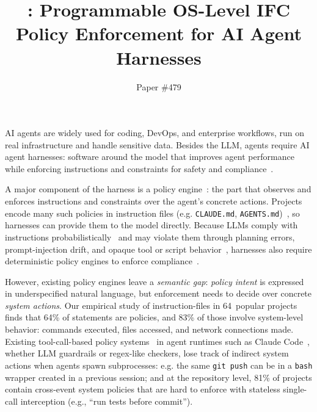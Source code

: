 \documentclass[sigplan,10pt]{acmart}
\title[\sys{}]{\sys{}: Programmable OS-Level IFC Policy Enforcement for AI Agent Harnesses}
\author{Paper \#479}
\affiliation{%
  \institution{Anonymous Submission}
  \city{}
  \country{}}
\begin{document}
\maketitle

AI agents are widely used for coding,
DevOps, and enterprise workflows\cite{yang2024sweagent,wang2025openhands,
debenedetti2024agentdojo,zhan2024injecagent,agentsight},
run on real infrastructure and handle sensitive data.
Besides the LLM,
agents require AI agent harnesses:
software around
the model that improves agent
performance while enforcing instructions
and constraints for safety and
compliance~\cite{fowler-harness}.

A major component of the harness is a policy engine~\cite{langchain-harness}: the
part that observes and enforces
instructions and constraints over
the agent's concrete
actions. Projects encode
many such
policies in instruction files
(e.g. \texttt{CLAUDE.md},
\texttt{AGENTS.md})~\cite{chatlatanagulchai2025manifests,
chatlatanagulchai2025agentreadmes,santos2025claudeconfig,
lulla2026agentsmd}, so
harnesses can provide them
to the model directly.
Because LLMs comply with
instructions
probabilistically~\cite{liu2024lost,jiang2024followbench,qi2025agentif}
and may violate them through planning errors,
prompt-injection drift,
and opaque tool or script
behavior~\cite{greshake2023indirectprompt,zhan2024injecagent,debenedetti2024agentdojo},
harnesses also require deterministic
policy engines to enforce
compliance~\cite{rebedea2023nemo,wang2025agentspec,debenedetti2025camel}.

However, existing policy engines leave a \emph{semantic gap}:
\emph{policy intent} is expressed in underspecified natural language,
but enforcement needs to decide over
concrete \emph{system actions}.
Our empirical study of instruction-files
 in 64~popular projects
finds that 64\% of statements
are policies, and 83\% of those
 involve system-level behavior:
 commands executed, files accessed,
and network connections made.
Existing
tool-call-based policy
systems~\cite{xiang2025guardagent,wang2025agentspec,
shi2025progent,costa2025fides,debenedetti2025camel} in agent
runtimes such as Claude Code~\cite{anthropic2025claudecode}, whether LLM
guardrails or regex-like checkers,
lose track of indirect system actions when
agents spawn subprocesses: e.g.
the same \texttt{git~push} can
be in a \texttt{bash} wrapper
created in a previous session;
and at the repository
level, 81\% of projects contain
cross-event system policies that
are hard to enforce with stateless
single-call interception (e.g.,
``run tests before
commit'').
\end{document}

